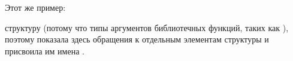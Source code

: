 ﻿

\subsubsectionold{\OptimizingKeilVI (\ThumbMode)}

Этот же пример:



\subsubsectionold{\OptimizingXcodeIV (\ThumbTwoMode)}

\IDA {} структуру  
(потому что \IDA {} типы аргументов библиотечных функций, 
таких как ), 
поэтому показала здесь обращения к отдельным элементам структуры и присвоила им имена
.


